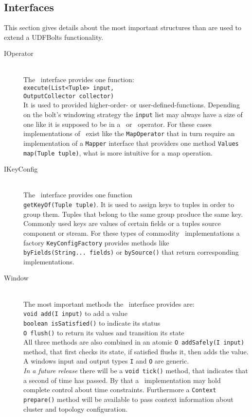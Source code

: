 \subsection{Interfaces}
\label{sect:interfaces}
This section gives details about the most important structures than are used to extend a UDFBolts functionality.
\begin{description}
	\item[IOperator] \hfill \\
	The \ioperator\ interface provides one function: \\
	\texttt{execute(List<Tuple> input, \\ OutputCollector collector)} \\
	It is used to provided higher-order- or user-defined-functions. Depending on the bolt's windowing strategy the \texttt{input} list may always have a size of one like it is supposed to be in a \map\ or \filter\ operator. For these cases implementations of \ioperator\ exist like the \texttt{MapOperator} that in turn require an implementation of a \texttt{Mapper} interface that providers one method \texttt{Values map(Tuple tuple)}, what is more intuitive for a map operation.
	\item[IKeyConfig] \hfill \\
	The \ikeyconfig\ interface provides one function \\ \texttt{getKeyOf(Tuple tuple)}. It is used to assign keys to tuples in order to group them. Tuples that belong to the same group produce the same key. Commonly used keys are values of certain fields or a tuples source component or stream. For these types of commodity  \ikeyconfig\ implementations a factory \texttt{KeyConfigFactory} provides methods like \\
	 \texttt{byFields(String... fields)} or \texttt{bySource()} that return corresponding implementations.
	\item[Window] \hfill \\
	The most important methods the \iwindow\ interface provides are:\\
	\texttt{void add(I input)} to add a value \\
	\texttt{boolean isSatisfied()} to indicate its status \\
	\texttt{O flush()} to return its values and transition its state  \\
	All three methods are also combined in an atomic 
	\texttt{O addSafely(I input)}
	method, that first checks its state, if satisfied flushs it, then adds the value.
	A windows input and output types \texttt{I} and \texttt{O} are generic. \\
	\textsl{In a future release} there will be a \texttt{void tick()} method, that indicates that a second of time has passed. By that a \iwindow\ implementation may hold complete control about time constraints. Furthermore a \texttt{Context prepare()} method will be available to pass context information about cluster and topology configuration. 
\end{description}

